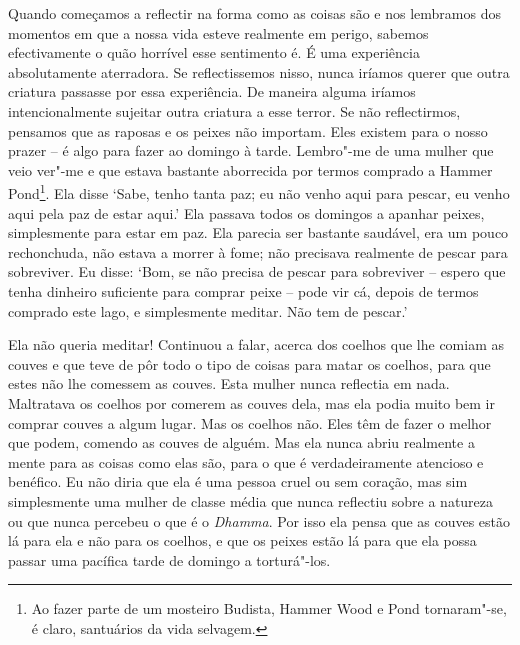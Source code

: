 Quando começamos a reflectir na forma como as coisas são e nos lembramos
dos momentos em que a nossa vida esteve realmente em perigo, sabemos
efectivamente o quão horrível esse sentimento é. É uma experiência absolutamente
aterradora. Se reflectissemos nisso, nunca iríamos querer que outra
criatura passasse por essa experiência. De maneira alguma iríamos
intencionalmente sujeitar outra criatura a esse terror. Se não
reflectirmos, pensamos que as raposas e os peixes não importam. Eles
existem para o nosso prazer -- é algo para fazer ao domingo à tarde.
Lembro"-me de uma mulher que veio ver"-me e que estava bastante aborrecida
por termos comprado a Hammer Pond\footnote{%
  Ao fazer parte de um mosteiro Budista, Hammer Wood e Pond tornaram"-se,
  é claro, santuários da vida selvagem.}.
Ela disse `Sabe, tenho tanta paz; eu
não venho aqui para pescar, eu venho aqui pela paz de estar aqui.' Ela
passava todos os domingos a apanhar peixes, simplesmente para estar em
paz. Ela parecia ser bastante saudável, era um pouco rechonchuda, não
estava a morrer à fome; não precisava realmente de pescar para
sobreviver. Eu disse: `Bom, se não precisa de pescar para sobreviver --
espero que tenha dinheiro suficiente para comprar peixe -- pode vir cá,
depois de termos comprado este lago, e simplesmente meditar. Não tem de
pescar.'

Ela não queria meditar! Continuou a falar, acerca dos coelhos que lhe
comiam as couves e que teve de pôr todo o tipo de coisas para matar os
coelhos, para que estes não lhe comessem as couves. Esta mulher nunca
reflectia em nada. Maltratava os coelhos por comerem as couves dela, mas
ela podia muito bem ir comprar couves a algum lugar. Mas os coelhos não.
Eles têm de fazer o melhor que podem, comendo as couves de alguém. Mas
ela nunca abriu realmente a mente para as coisas como elas são, para o
que é verdadeiramente atencioso e benéfico. Eu não diria que ela é uma
pessoa cruel ou sem coração, mas sim simplesmente uma mulher de classe média 
que nunca reflectiu sobre a natureza ou que nunca percebeu
o que é o \emph{Dhamma}. Por isso ela pensa que as couves estão lá para
ela e não para os coelhos, e que os peixes estão lá para que ela possa
passar uma pacífica tarde de domingo a torturá"-los.

